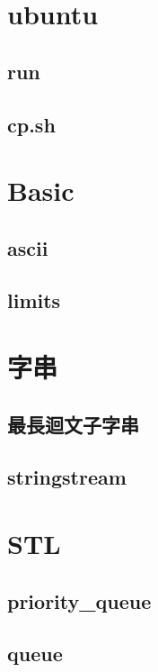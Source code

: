 \section{ubuntu}
    \subsection{run}
        
    \subsection{cp.sh}
        

\section{Basic}
    \subsection{ascii}
        
    \subsection{limits}
        

\section{字串}
    \subsection{最長迴文子字串}
        
    \subsection{stringstream}
        

\section{STL}
    \subsection{priority\_queue}
        
    \subsection{queue}
        

